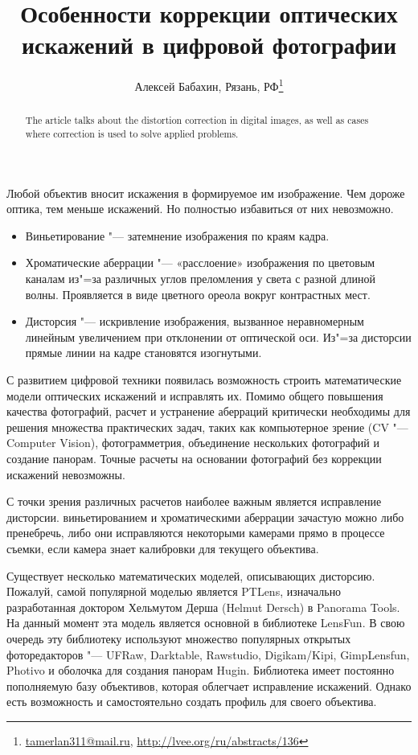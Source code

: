 \documentclass[10pt, a5paper]{article}
\begin{document}
\title{Особенности коррекции оптических искажений в цифровой фотографии}
\author{Алексей Бабахин, Рязань, РФ\footnote{\url{tamerlan311@mail.ru}, \url{http://lvee.org/ru/abstracts/136}}}
\maketitle
\begin{abstract}
The article talks about the distortion correction in digital images, as well as cases where correction is used to solve applied problems.
\end{abstract}
Любой объектив вносит искажения в формируемое им изображение. Чем дороже оптика, тем меньше искажений. Но полностью избавиться от них невозможно.

\begin{itemize}
  \item Виньетирование "--- затемнение изображения по краям кадра.
  \item Хроматические аберрации "--- «расслоение» изображения по \linebreak цветовым каналам из"=за различных углов преломления у света с разной длиной волны. Проявляется в виде цветного ореола вокруг контрастных мест.
  \item Дисторсия "--- искривление изображения, вызванное неравномерным линейным увеличением при отклонении от оптической оси. Из"=за дисторсии прямые линии на кадре становятся изогнутыми.
\end{itemize}

С развитием цифровой техники появилась возможность строить математические модели оптических искажений и исправлять их. Помимо общего повышения качества фотографий, расчет и устранение аберраций критически необходимы для решения множества практических задач, таких как компьютерное зрение (CV "--- Compu\-ter Vision), фотограмметрия, объединение нескольких фотографий и создание панорам. Точные расчеты на основании фотографий без коррекции искажений невозможны.

С точки зрения различных расчетов наиболее важным является исправление дисторсии. виньетированием и хроматическими аберрации зачастую можно либо пренебречь, либо они исправляются некоторыми камерами прямо в процессе съемки, если камера знает калибровки для текущего объектива.

Существует несколько математических моделей, описывающих дисторсию. Пожалуй, самой популярной моделью является PTLens, изначально разработанная доктором Хельмутом Дерша (Helmut \linebreak Dersch) в Panorama Tools. На данный момент эта модель является основной в библиотеке LensFun. В свою очередь эту библиотеку используют множество популярных открытых фоторедакторов "--- UFRaw, Darktable, Rawstudio, Digikam/Kipi, GimpLensfun, Photivo и оболочка для создания панорам Hugin. Библиотека имеет постоянно пополняемую базу объективов, которая облегчает исправление искажений. Однако есть возможность и самостоятельно создать профиль для своего объектива.
\end{document}
